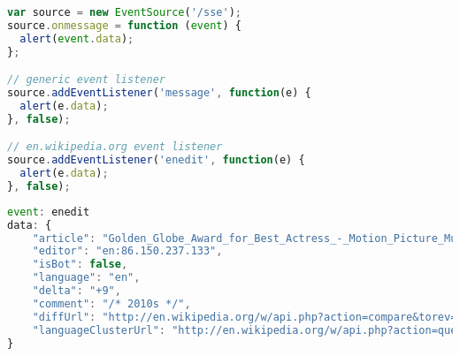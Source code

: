 \documentclass{sig-alternate}
\begin{document}
\begin{lstlisting}[caption={Creation of an \texttt{EventSource}
  object and registering an event listener},
  label=code:sse-client, float=b!, language=JavaScript]
var source = new EventSource('/sse');
source.onmessage = function (event) {
  alert(event.data);
};

// generic event listener
source.addEventListener('message', function(e) {
  alert(e.data);
}, false);

// en.wikipedia.org event listener
source.addEventListener('enedit', function(e) {
  alert(e.data);
}, false);

\end{lstlisting}

\begin{lstlisting}[caption={Server-Sent Event of type ``enedit''
  (formatted for legibility)},
  label=code:sse-server, float=b!, language=JavaScript]
event: enedit
data: {
    "article": "Golden_Globe_Award_for_Best_Actress_-_Motion_Picture_Musical_or_Comedy",
    "editor": "en:86.150.237.133",
    "isBot": false,
    "language": "en",
    "delta": "+9",
    "comment": "/* 2010s */",
    "diffUrl": "http://en.wikipedia.org/w/api.php?action=compare&torev=585820379&fromrev=585776128&format=json",
    "languageClusterUrl": "http://en.wikipedia.org/w/api.php?action=query&prop=langlinks&format=json&lllimit=500&titles=Golden_Globe_Award_for_Best_Actress_-_Motion_Picture_Musical_or_Comedy"
}
\end{lstlisting}



\end{document}
